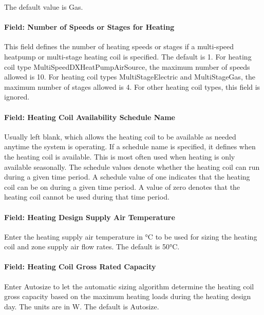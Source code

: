 The default value is Gas.

\paragraph{Field: Number of Speeds or Stages for Heating}\label{field-number-of-speeds-or-stages-for-heating}

This field defines the number of heating speeds or stages if a multi-speed heatpump or multi-stage heating coil is specified. The default is 1. For heating coil type MultiSpeedDXHeatPumpAirSource, the maximum number of speeds allowed is 10. For heating coil types MultiStageElectric and MultiStageGas, the maximum number of stages allowed is 4. For other heating coil types, this field is ignored.

\paragraph{Field: Heating Coil Availability Schedule Name}\label{field-heating-coil-availability-schedule-name-3}

Usually left blank, which allows the heating coil to be available as needed anytime the system is operating. If a schedule name is specified, it defines when the heating coil is available. This is most often used when heating is only available seasonally. The schedule values denote whether the heating coil can run during a given time period. A schedule value of one indicates that the heating coil can be on during a given time period. A value of zero denotes that the heating coil cannot be used during that time period.

\paragraph{Field: Heating Design Supply Air Temperature}\label{field-heating-design-supply-air-temperature-2}

Enter the heating supply air temperature in °C to be used for sizing the heating coil and zone supply air flow rates. The default is 50°C.

\paragraph{Field: Heating Coil Gross Rated Capacity}\label{field-heating-coil-gross-rated-capacity}

Enter Autosize to let the automatic sizing algorithm determine the heating coil gross capacity based on the maximum heating loads during the heating design day. The units are in W. The default is Autosize.

